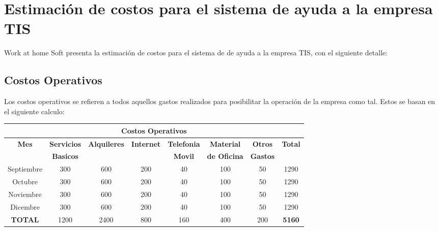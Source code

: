 \documentclass[11pt,letterpaper]{report}
\begin{document}
\section{Estimación de costos para el sistema de ayuda a la empresa TIS}\label{sec:economico}
Work at home Soft presenta la estimación de costos para el sistema de de ayuda a la empresa TIS, con el siguiente detalle:
\subsection{Costos Operativos}
Los costos operativos se refieren a todos aquellos gastos realizados para posibilitar la operación de la empresa como tal. Estos se basan en el siguiente calculo: \\
\begin{center}
	\begin{tabular}{|c|c|c|c|c|c|c|c|}
		\hline
		\multicolumn{8}{|c|}{\textbf{Costos Operativos}} \\ \hline
		\textbf{Mes}	& \textbf{Servicios}	& \textbf{Alquileres} & \textbf{Internet} & \textbf{Telefonia} & \textbf{Material}	& \textbf{Otros}	& \textbf{Total} \\
		& \textbf{Basicos} & & & \textbf{Movil} & \textbf{de Oficina} & \textbf{Gastos} & \\ \hline
		Septiembre & 300 & 600	& 200	& 40	& 100	& 50	& 1290 \\ \hline
		Octubre	& 300	& 600	& 200	& 40	& 100	& 50	& 1290 \\ \hline
		Noviembre	& 300	& 600	& 200	& 40	& 100	& 50	& 1290 \\ \hline
		Dicembre	& 300	& 600	& 200	& 40	& 100	& 50	& 1290 \\ \hline
		\textbf{TOTAL}	& 1200	& 2400	& 800	& 160	& 400	& 200	& \textbf{5160} \\ \hline
	\end{tabular}
\end{center}
\end{document}
